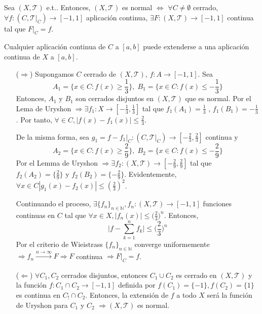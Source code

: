 \begin{theo}
  Sea $( X, \mathcal{T} )$ e.t.. Entonces, $( X, \mathcal{T} )$ es normal $\Leftrightarrow$ $\forall C \neq \emptyset$ cerrado, $\forall f: ( C, \mathcal{T}|_{C}) \to [-1, 1]$ aplicación continua, $\exists F: ( X, \mathcal{T} ) \to [-1, 1]$ continua tal que $ F|_{C} = f$.
\end{theo}

\begin{obs}
  Cualquier aplicación continua de $C$ a $[a, b]$ puede extenderse a una aplicación continua de $X$ a $[a, b]$.
\end{obs}

\begin{dem}
  \begin{enumerate}[label=(\roman*)]
    \item [($\Rightarrow$)] Supongamos $C$ cerrado de $( X, \mathcal{T} )$, $f: A \to [-1, 1]$. Sea
      \[ 
        A_{1} = \Big \{  x \in C: f(x) \geq \frac{1}{3}  \Big \}, \; B_{1} = \Big \{  x \in C: f(x) \leq -\frac{1}{3} \Big \}
      \] 
      Entonces, $A_{1}$ y $ B_{1}$ son cerrados disjuntos en $( X, \mathcal{T} )$ que es normal. Por el Lema de Uryshon $\Rightarrow \exists f_{1}: X \to [-\frac{1}{3}, \frac{1}{3}]$ tal que $f_{1}(A_{1}) = \frac{1}{3}$ , $f_{1}(B_{1}) = - \frac{1}{3}$. Por tanto, $\forall \in C, | f(x) - f_{1}(x) | \leq \frac{2}{3}$.

      De la misma forma, sea $g_{1} = f - f_{1}|_{C}: ( C, \mathcal{T}|_{C}) \to [-\frac{2}{3}, \frac{2}{3}]$ continua y 
      \[ 
        A_{2} = \Big \{  x \in C: f(x) \geq \frac{2}{9}  \Big \}, \; B_{2} = \Big \{  x \in C: f(x) \leq -\frac{2}{9} \Big \}
      \] 
      Por el Lemma de Uryshon $\Rightarrow \exists f_{2}: ( X, \mathcal{T} ) \to [-\frac{2}{9}, \frac{2}{9}]$ tal que $f_{2}(A_{2}) = \{  \frac{2}{9} \}$ y $f_{2}(B_{2}) = \{ - \frac{2}{9} \}$.
     Evidentemente, $\forall x \in C | g_{1}(x) - f_{2}(x) | \leq (\frac{2}{3})^2$.

     Continuando el proceso, $\exists \{ f_{n} \}_{n \in \mathbb{N}}, f_{n}: ( X, \mathcal{T} ) \to [-1, 1]$ funciones continuas en $C$ tal que $\forall x \in X, | f_{n}(x) | \leq \big ( \frac{2}{3} \big )^{n}$. Entonces, 
      \[ 
        \Big | f - \sum_{k = 1}^{n} f_{k} \Big | \leq \Big (\frac{2}{3} \Big )^{n} 
      \] 
      Por el criterio de Wieistrass $\{ f_{n} \}_{n \in \mathbb{N}}$ converge uniformemente $\Rightarrow f_{n} \xrightarrow[]{ n \rightarrow \infty } F \Rightarrow F$ continua $\Rightarrow F|_{C} = f$.
    \item [($\Leftarrow$)] $\forall C_{1}, C_{2}$ cerrados disjuntos, entonces $C_{1} \cup C_{2}$ es cerrado en $( X, \mathcal{T} )$ y la función $f: C_{1} \cap C_{2} \to [-1, 1]$ definida por $f(C_{1}) = \{  -1 \}, f(C_{2}) = \{ 1 \}$ es continua en $C_! \cap C_{2}$. Entonces, la extensión de $f$ a todo $X$ será la función de Uryshon para $C_{1}$ y $C_{2}$ $\Rightarrow ( X, \mathcal{T} )$ es normal.
  \end{enumerate}
\end{dem}

